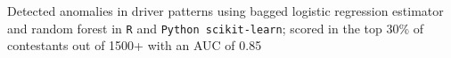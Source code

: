 \documentclass[]{deedy-resume-openfont}
\begin{document}
\sectionsep



\begin{tightemize}

\item Detected anomalies in driver patterns using bagged logistic regression estimator and random forest in \verb|R| and \verb|Python scikit-learn|; scored in the top 30\% of contestants out of 1500+ with an AUC of 0.85


\end{tightemize}
\end{document}

